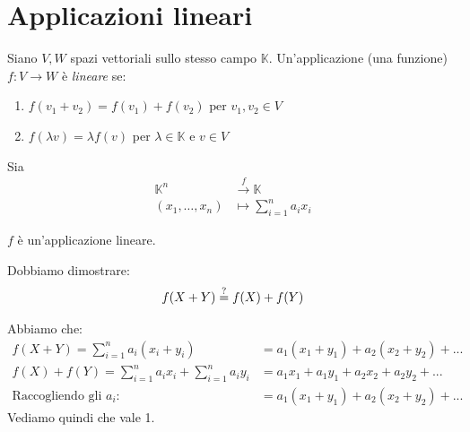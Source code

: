 

\chapter{Applicazioni lineari}\label{chap:applicazioni_lineari}
\begin{definizione*}[]

  Siano $V,W$ spazi vettoriali sullo stesso campo $\mathbb{K}$. Un'applicazione (una funzione) $f:V\to W$ è \textit{lineare} se:

  \begin{enumerate}
    \item $f(v_1+v_2)=f(v_1)+f(v_2) \text{ per } v_1,v_2\in V$
    \item $f(\lambda v)=\lambda f(v)$ per $\lambda\in \mathbb{K}$ e $v\in V$
  \end{enumerate}

\end{definizione*}

\begin{esempio*}[]

Sia
\begin{align}
  \mathbb{K}^n & \xrightarrow{f} \mathbb{K}\\
  (x_1,\dots,x_n) & \mapsto \sum_{i=1}^{n}a_ix_i \nonumber
\end{align}

$f$ è un'applicazione lineare.
\end{esempio*}

\begin{dimostrazione}[Punto 1.]
Dobbiamo dimostrare:
  \begin{equation}
    f(X+Y) \overset{?}{=} f(X)+f(Y) \\
  \end{equation}

\newpage
  Abbiamo che:
  \begin{align*}
    f(X+Y)=\sum_{i=1}^{n}a_i(x_i+y_i) & = a_1(x_1+y_1)+a_2(x_2+y_2)+... \\
    f(X) + f(Y) = \sum_{i=1}^{n}a_ix_i+\sum_{i=1}^{n}a_iy_i & = a_1x_1 + a_1y_1 + a_2x_2 + a_2y_2 +... \\
    \text{Raccogliendo gli $a_i$: }& = a_1(x_1+y_1) + a_2(x_2+y_2) + ...
  \end{align*}
  Vediamo quindi che vale 1.

\end{dimostrazione}

